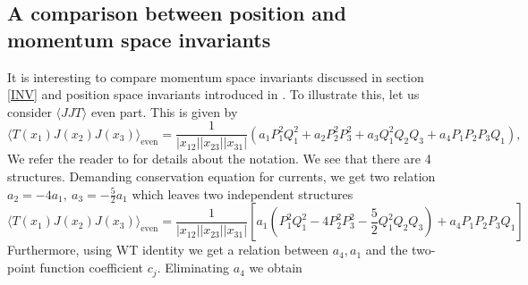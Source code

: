 \documentclass[a4paper,11pt]{article}
\begin{document}
\subsection{A comparison between position and momentum space invariants}
It is interesting to compare momentum space invariants discussed in section \ref{INV} and position space invariants  introduced in \cite{Giombi:2011rz, Costa:2011mg}.
 To illustrate this, let us consider $\langle JJT \rangle$ even part. This is given by 
\begin{equation}\label{conformlinvp}
 \langle T(x_1) J(x_2) J(x_3) \rangle_{\text{even}} =\frac{1}{|x_{12}|| x_{23}||x_{31}|}\left(a_1 P_1^2 Q_1^2 + a_2 P_2^2 P_3^2 + a_3 Q_1^2 Q_2 Q_3 + a_4 P_1 P_2 P_3 Q_1\right),  
\end{equation}
We refer the reader to \cite{Giombi:2011rz} for details about the notation. We see that there are 4 structures. Demanding conservation equation for currents, we get two relation $a_2 = -4 a_1, ~a_3 =-\frac{5}{2} a_1$ which leaves two independent  structures
\begin{equation}\label{consconjt}
 \langle T(x_1) J(x_2) J(x_3) \rangle_{\text{even}} =\frac{1}{|x_{12}|| x_{23}||x_{31}|}\left[a_1 \left(P_1^2 Q_1^2 -4 P_2^2 P_3^2 - \frac{5}{2} Q_1^2 Q_2 Q_3\right) + a_4 P_1 P_2 P_3 Q_1\right]  
\end{equation}
 Furthermore, using WT identity we get a relation between $a_4, a_1$ and the two-point function coefficient $c_j.$ Eliminating $a_4$ we obtain
\end{document}
